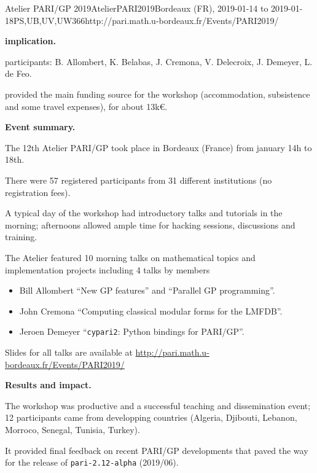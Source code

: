 \begin{event}{Atelier PARI/GP 2019}{AtelierPARI2019}{Bordeaux (FR),
2019-01-14 to 2019-01-18}{PS,UB,UV,UW}{36}{6}{http://pari.math.u-bordeaux.fr/Events/PARI2019/}


\textbf{\ODK implication.}

\ODK participants: B. Allombert, K. Belabas, J. Cremona, V. Delecroix, J.
Demeyer, L. de Feo.

\ODK provided the main funding source for the workshop (accommodation,
subsistence and some travel expenses), for about 13k\euro.

\textbf{Event summary.}

The 12th Atelier PARI/GP took place in Bordeaux (France) from january
14h to 18th.

There were 57 registered participants from 31 different institutions
(no registration fees).

A typical day of the workshop had introductory talks and tutorials
in the morning; afternoons allowed ample time for hacking sessions,
discussions and training.

The Atelier featured 10 morning talks on mathematical topics and
implementation projects including 4 talks by \ODK members
\begin{itemize}
\item Bill Allombert ``New GP features'' and ``Parallel GP programming''.
\item John Cremona ``Computing classical modular forms for the LMFDB''.
\item Jeroen Demeyer ``\texttt{cypari2}: Python bindings for PARI/GP''.
\end{itemize}

Slides for all talks are available at
\url{http://pari.math.u-bordeaux.fr/Events/PARI2019/}

\textbf{Results and impact.}

The workshop was productive and a successful teaching and dissemination
event; 12 participants came from developping countries (Algeria, Djibouti,
Lebanon, Morroco, Senegal, Tunisia, Turkey).

It provided final feedback on recent PARI/GP developments that paved the way
for the release of \texttt{pari-2.12-alpha} (2019/06).


\end{event}
